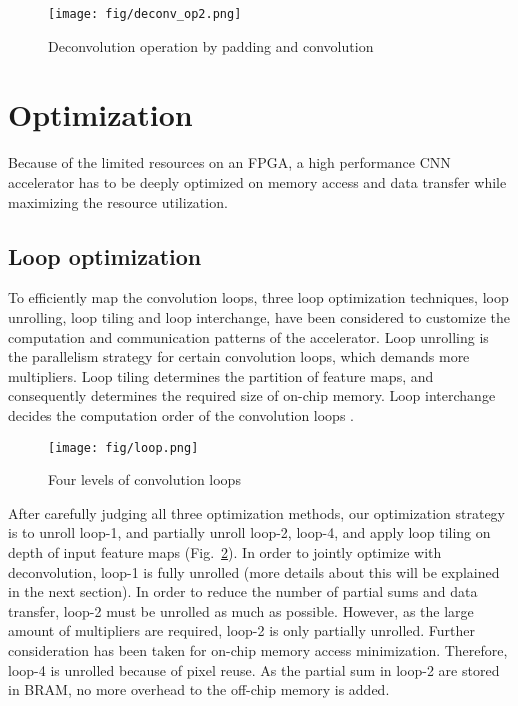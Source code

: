 \documentclass[conference]{IEEEtran}
\begin{document}
\begin{comment}
Fig.~\ref{fig:deconv_op} demonstrates an example of the deconvolution when stride=2 and kernel size=3.
The deconvolution visualization in case of stride=2 and kernel size=3, is demonstrated in Fig.~\ref{fig:deconv_op}. It demonstrates how to upsample a $2\times 2$ feature map into $3\times 3$ or $4\time 4$ feature map.
\end{comment}
\begin{figure}[htbp]
	\centering
	\texttt{[image: fig/deconv\_op2.png]}
	\caption{Deconvolution operation by padding and convolution}
	\label{fig:deconv_op}
\end{figure}

\section{Optimization}\label{sec:Optimization}
Because of the limited resources on an FPGA, a high performance CNN accelerator has to be deeply optimized on memory access and data transfer while maximizing the resource utilization.
\subsection{Loop optimization}
To efficiently map the convolution loops, three loop optimization techniques, loop unrolling, loop tiling and loop interchange, have been considered to customize the computation and communication patterns of the accelerator. Loop unrolling is the parallelism strategy for certain convolution loops, which demands more multipliers. Loop tiling determines the partition of feature maps, and consequently determines the required size of on-chip memory. Loop interchange decides the computation order of the convolution loops \cite{ref:optmloop_2017}.

\begin{figure}[htbp]
	\centering
	\texttt{[image: fig/loop.png]}
	\caption{Four levels of convolution loops}
	\label{fig:conv_loop}
\end{figure}

After carefully judging all three optimization methods, our optimization strategy is to unroll loop-1, and partially unroll loop-2, loop-4, and apply loop tiling on depth of input feature maps (Fig.~\ref{fig:conv_loop}). In order to jointly optimize with deconvolution, loop-1 is fully unrolled (more details about this will be explained in the next section). In order to reduce the number of partial sums and data transfer, loop-2 must be unrolled as much as possible. However, as the large amount of multipliers are required, loop-2 is only partially unrolled. Further consideration has been taken for on-chip memory access minimization. Therefore, loop-4 is unrolled because of pixel reuse. As the partial sum in loop-2 are stored in BRAM, no more overhead to the off-chip memory is added.
\end{document}
